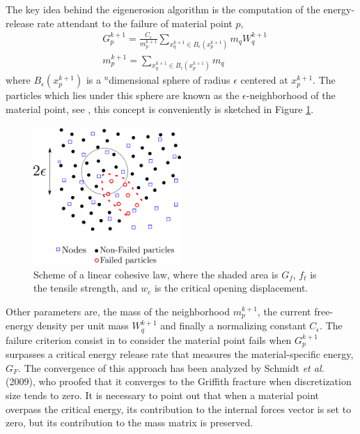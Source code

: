 \message{ !name(2020_EFM_MPM_Eigensoftening.tex)}\documentclass[preprint,12pt,a4paper]{elsarticle}
\begin{document}
The key idea behind the eigenerosion algorithm is the computation of the
energy-release rate attendant to the failure of material point $p$,
\begin{align}
  \label{eq:energy-release-EE}
&G_p^{k+1} = \frac{C_{\epsilon}}{m_p^{k+1}}  \sum_{x_q^{k+1} \in
  B_{\epsilon}(x_p^{k+1})} m_q W_q^{k+1}\\
&m_p^{k+1} =  \sum_{x_q^{k+1} \in
  B_{\epsilon}(x_p^{k+1})} m_q  
\end{align}
where $B_{\epsilon}(x_p^{k+1})$ is a $^n$dimensional sphere of radius $\epsilon$
centered at $x_p^{k+1}$. The particles which lies under this sphere are
known as the $\epsilon$-neighborhood of the material point, see
\cite{Pandolfi_2012}, this concept is conveniently is sketched in
Figure \ref{fig:Failed-particles}.
\begin{figure}
  \centering
  \includegraphics[width=0.5\textwidth]{Figure-Particle-failed}
  \caption{Scheme of a linear cohesive law, where the shaded area is
    $G_f$, $f_t$ is the tensile strength, and $w_c$ is the critical
    opening displacement.}
  \label{fig:Failed-particles}
\end{figure}
Other parameters are, the mass of the neighborhood $m_p^{k+1}$, the
current free-energy density per unit mass  $W_q^{k+1}$ and finally a
normalizing constant $C_{\epsilon}$. 
The failure criterion consist in to consider the material point fails
when $G_p^{k+1}$ surpasses a critical energy release rate that
measures the material-specific energy, $G_F$. The convergence of this
approach has been analyzed by Schmidt {\it et al.}
(2009)\cite{Schmidt_2009}, who proofed that it converges to the Griffith
fracture when discretization size tends to zero. It is necessary to
point out that when a material point overpass the critical energy, its
contribution to the internal forces vector is set to zero, but its
contribution to the mass matrix is preserved.\\
\end{document}
